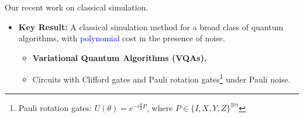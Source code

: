 \documentclass[10pt]{beamer}
\begin{document}
\begin{CJK}{UTF8}{gbsn}
{%
}

\begin{frame}[fragile]
  Our recent work on classical simulation.
  \begin{itemize}
    \item \textbf{Key Result:} A classical simulation method for a broad class of quantum algorithms, 
    with \textcolor{blue}{polynomial} cost in the presence of noise.
    \begin{itemize}
      \item \textbf{Variational Quantum Algorithms (VQAs).}
      \item Circuits with Clifford gates and Pauli rotation gates\footnote{Pauli rotation gates: $U(\theta)=e^{-i\frac{\theta}{2}P}$, where $P\in\{I,X,Y,Z\}^{\otimes n}$} under Pauli noise.
    \end{itemize}
  \end{itemize}
\end{frame}



\end{CJK}
\end{document}

